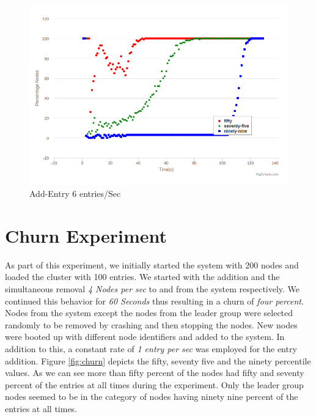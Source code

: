 \documentclass[12pt,a4paper,twoside,openright]{book}
\begin{document}
\begin{figure}[h]
	\includegraphics[scale=0.5]{200-6EntryPerSec}
	\caption{Add-Entry 6 entries/Sec}
	\label{fig:addEntry6}
\end{figure}

\section{Churn Experiment}

As part of this experiment, we initially started the system with 200 nodes and loaded the cluster with 100 entries. We started with the addition and the simultaneous removal \textit{4 Nodes per sec} to and from the system respectively. We continued this behavior for \textit{60 Seconds} thus resulting in a churn of \textit{four percent}. Nodes from the system except the nodes from the leader group were selected randomly to be removed by crashing and then stopping the nodes. New nodes were booted up with different node identifiers and added to the system. In addition to this, a constant rate of \textit{1 entry per sec} was employed for the entry addition. Figure \ref{fig:churn} depicts the fifty, seventy five and the ninety percentile values. As we can see more than fifty percent of the nodes had fifty and seventy percent of the entries at all times during the experiment. Only the leader group nodes seemed to be in the category of nodes having ninety nine percent of the entries at all times. 
\end{document}

